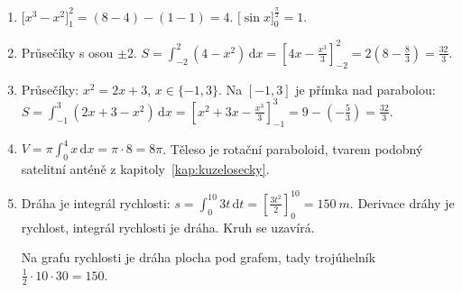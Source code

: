 \begin{solution}
  \begin{enumerate}[label=(\alph*)]
    \item ${\big[x^3 - x^2\big]}_1^2 = (8 - 4) - (1 - 1) = 4$. ${\big[\sin x\big]}_0^{\frac{\pi}{2}} = 1$.
    \item Průsečíky s osou $\pm 2$. $S = \int_{-2}^{2}(4 - x^2)\,\mathrm{d}x = {\left[4x - \frac{x^3}{3}\right]}_{-2}^{2} = 2\left(8 - \frac{8}{3}\right) = \frac{32}{3}$.
    \item Průsečíky: $x^2 = 2x + 3$, $x\in\{-1, 3\}$. Na $[-1, 3]$ je přímka nad parabolou: $S = \int_{-1}^{3}(2x + 3 - x^2)\,\mathrm{d}x = {\left[x^2 + 3x - \frac{x^3}{3}\right]}_{-1}^{3} = 9 - \left(-\frac{5}{3}\right) = \frac{32}{3}$.
    \item $V = \pi\int_0^4 x\,\mathrm{d}x = \pi\cdot 8 = 8\pi$. Těleso je rotační paraboloid, tvarem podobný satelitní anténě z kapitoly~\ref{kap:kuzelosecky}.
    \item Dráha je integrál rychlosti: $s = \int_0^{10}3t\,\mathrm{d}t = {\left[\frac{3t^2}{2}\right]}_0^{10} = 150\ \si{m}$. Derivace dráhy je rychlost, integrál rychlosti je dráha. Kruh se uzavírá.

    \begin{center}
    \end{center}
    Na grafu rychlosti je dráha plocha pod grafem, tady trojúhelník $\frac{1}{2}\cdot 10\cdot 30 = 150$.
  \end{enumerate}
\end{solution}

